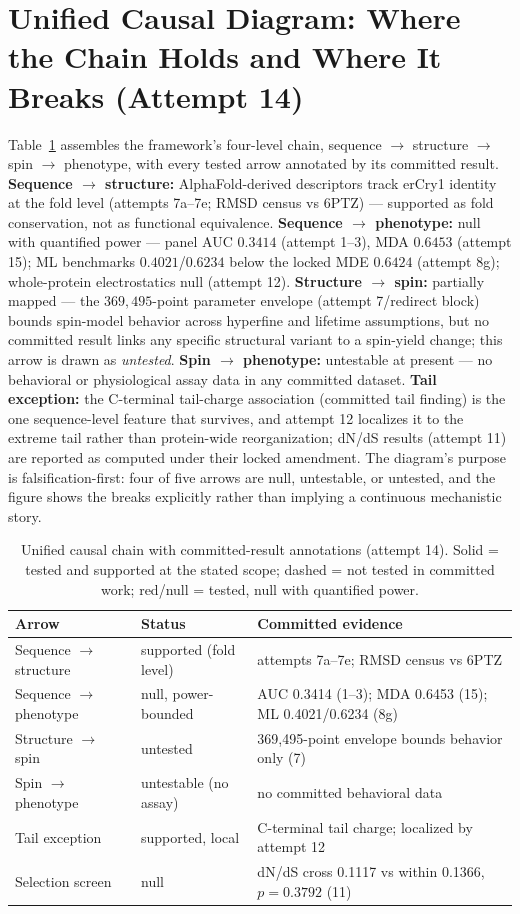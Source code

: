 \documentclass[12pt,a4paper]{article}
\begin{document}
\section{Unified Causal Diagram: Where the Chain Holds and Where It Breaks (Attempt 14)}
Table~\ref{fig:chain} assembles the framework's four-level chain, sequence $\rightarrow$ structure $\rightarrow$ spin $\rightarrow$ phenotype, with every tested arrow annotated by its committed result. \textbf{Sequence $\rightarrow$ structure:} AlphaFold-derived descriptors track erCry1 identity at the fold level (attempts 7a--7e; RMSD census vs 6PTZ) --- supported as fold conservation, not as functional equivalence. \textbf{Sequence $\rightarrow$ phenotype:} null with quantified power --- panel AUC $0.3414$ (attempt 1--3), MDA $0.6453$ (attempt 15); ML benchmarks $0.4021$/$0.6234$ below the locked MDE $0.6424$ (attempt 8g); whole-protein electrostatics null (attempt 12). \textbf{Structure $\rightarrow$ spin:} partially mapped --- the $369{,}495$-point parameter envelope (attempt 7/redirect block) bounds spin-model behavior across hyperfine and lifetime assumptions, but no committed result links any specific structural variant to a spin-yield change; this arrow is drawn as \emph{untested}. \textbf{Spin $\rightarrow$ phenotype:} untestable at present --- no behavioral or physiological assay data in any committed dataset. \textbf{Tail exception:} the C-terminal tail-charge association (committed tail finding) is the one sequence-level feature that survives, and attempt 12 localizes it to the extreme tail rather than protein-wide reorganization; dN/dS results (attempt 11) are reported as computed under their locked amendment. The diagram's purpose is falsification-first: four of five arrows are null, untestable, or untested, and the figure shows the breaks explicitly rather than implying a continuous mechanistic story.
\begin{table}[h]
\centering\small
\caption{Unified causal chain with committed-result annotations (attempt 14). Solid = tested and supported at the stated scope; dashed = not tested in committed work; red/null = tested, null with quantified power.}
\label{fig:chain}
\begin{tabular}{lll}
\hline
Arrow & Status & Committed evidence \\
\hline
Sequence $\rightarrow$ structure & supported (fold level) & attempts 7a--7e; RMSD census vs 6PTZ \\
Sequence $\rightarrow$ phenotype & null, power-bounded & AUC 0.3414 (1--3); MDA 0.6453 (15); ML 0.4021/0.6234 (8g) \\
Structure $\rightarrow$ spin & untested & 369{,}495-point envelope bounds behavior only (7) \\
Spin $\rightarrow$ phenotype & untestable (no assay) & no committed behavioral data \\
Tail exception & supported, local & C-terminal tail charge; localized by attempt 12 \\
Selection screen & null & dN/dS cross 0.1117 vs within 0.1366, $p=0.3792$ (11) \\
\hline
\end{tabular}
\end{table}
\end{document}
